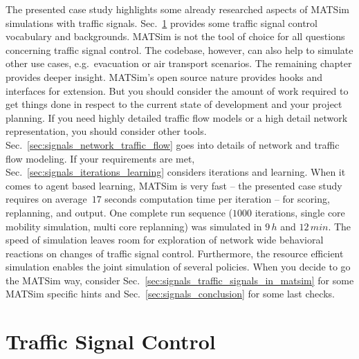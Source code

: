 The presented case study highlights some already researched aspects of MATSim simulations with traffic signals. 
Sec.~\ref{sec:signals_traffic_signal_control} provides some traffic signal control vocabulary and backgrounds.  
MATSim is not the tool of choice for all questions concerning traffic signal control. 
The codebase, however, can also help to simulate other use cases, e.g.~evacuation or air transport scenarios. 
The remaining chapter provides deeper insight.  
MATSim's open source nature provides hooks and interfaces for extension. 
But you should consider the amount of work required to get things done in respect to the current state of development and your project planning. 
If you need highly detailed traffic flow models or a high detail network representation, you should consider other tools. 
Sec.~\ref{sec:signals_network_traffic_flow} goes into details of network and traffic flow modeling. 
If your requirements are met, Sec.~\ref{sec:signals_iterations_learning} considers iterations and learning. 
When it comes to agent based learning, MATSim is very fast -- the presented case study requires on average~$17$ seconds computation time per iteration -- for scoring, replanning, and output. One complete run sequence ($1000$ iterations, single core mobility simulation, multi core replanning) was simulated in $9 \, h$ and $12 \, min$. 
The speed of simulation leaves room for exploration of network wide behavioral reactions on changes of traffic signal control. 
Furthermore, the resource efficient simulation enables the joint simulation of several policies. 
When you decide to go the MATSim way, consider Sec.~\ref{sec:signals_traffic_signals_in_matsim} for some MATSim specific hints and Sec.~\ref{sec:signals_conclusion} for some last checks. 



\section{Traffic Signal Control}
\label{sec:signals_traffic_signal_control}



